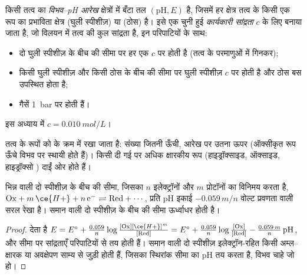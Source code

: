 \begin{definition}[विभव--pH आरेख, कार्यकारी सांद्रता]\label{def:b1:e-ph-diagrams:e-ph-diagram}
किसी तत्व का \emph{विभव--pH आरेख}
क्षेत्रों में बँटा तल $(\mathrm{pH}, E)$ है, जिसमें हर क्षेत्र तत्व के किसी एक रूप का
प्रभाविता क्षेत्र (घुली स्पीशीज़) या  (ठोस) है। इसे एक चुनी हुई
\emph{कार्यकारी सांद्रता} $c$ के लिए बनाया जाता है, जो
विलयन में तत्व की कुल सांद्रता है, इन परिपाटियों के साथ:
\begin{itemize}
  \item दो घुली स्पीशीज़ के बीच की सीमा पर हर एक $c$ पर होती है
        (तत्व के परमाणुओं में गिनकर);
  \item किसी घुली स्पीशीज़ और किसी ठोस के बीच की सीमा पर
        घुली स्पीशीज़ $c$ पर होती है और ठोस बस उपस्थित होता है;
  \item गैसें \qty{1}{bar} पर होती हैं।
\end{itemize}
इस अध्याय में $c = \qty{0.010}{mol/L}$।
\end{definition}

तत्व के रूपों को  के क्रम में रखा जाता है: संख्या जितनी ऊँची,
आरेख पर उतना ऊपर (ऑक्सीकृत रूप ऊँचे विभव पर स्थायी होते हैं)।
किसी दी गई  पर अधिक क्षारकीय रूप
(हाइड्रॉक्साइड, ऑक्साइड, हाइड्रॉक्सो ) दाईं ओर होते हैं।

\begin{proposition}[सीमा की प्रवणता]\label{prop:b1:e-ph-diagrams:boundary-slope}
भिन्न  वाली दो स्पीशीज़ के बीच की सीमा, जिसका
 $n$ इलेक्ट्रॉनों और $m$ प्रोटॉनों का विनिमय करता है,
$\mathrm{Ox} + m\,\ce{H+} + n\,\mathrm{e^-} \rightleftharpoons \mathrm{Red} +
\cdots$, प्रति pH इकाई $-0.059\,m/n$ वोल्ट प्रवणता वाली सरल रेखा है। समान
 वाली दो स्पीशीज़ के बीच की सीमा ऊर्ध्वाधर होती है।
\end{proposition}

\begin{proof}
 देता है $E = E^\circ + \frac{0.059}{n}\log\frac{[\mathrm{Ox}]
[\ce{H+}]^m}{[\mathrm{Red}]} = E^\circ + \frac{0.059}{n}\log\frac{[\mathrm{Ox}]}
{[\mathrm{Red}]} - \frac{0.059\,m}{n}\,\mathrm{pH}$, और सीमा पर
सांद्रताएँ परिपाटियों से तय होती हैं। समान
 वाली दो स्पीशीज़ इलेक्ट्रॉन-रहित किसी अम्ल--क्षारक या अवक्षेपण साम्य से
जुड़ी होती हैं, जिसका स्थिरांक सीमा का pH तय करता है,
विभव चाहे जो हो।
\end{proof}

